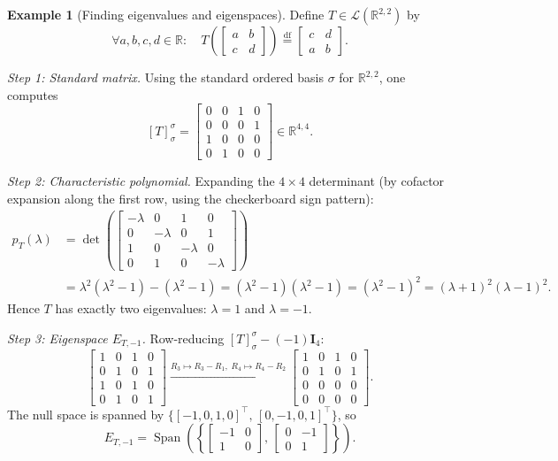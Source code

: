 \documentclass[11pt, a4paper, notitlepage]{report}
\theoremstyle{definition}
\newtheorem{example}[theorem]{Example}
\theoremstyle{remark}
\begin{document}
\begin{example}[Finding eigenvalues and eigenspaces]\label{ex:eigenspace-computation}
Define $T \in \mathcal{L}(\mathbb{R}^{2,2})$ by
\[
  \forall a,b,c,d \in \mathbb{R} : \quad
  T\!\left(\begin{bmatrix}a&b\\c&d\end{bmatrix}\right)
  \stackrel{\mathrm{df}}{=}
  \begin{bmatrix}c&d\\a&b\end{bmatrix}.
\]

\emph{Step 1: Standard matrix.} Using the standard ordered basis $\sigma$ for
$\mathbb{R}^{2,2}$, one computes
\[
  [T]_\sigma^\sigma =
  \begin{bmatrix}0&0&1&0\\0&0&0&1\\1&0&0&0\\0&1&0&0\end{bmatrix} \in \mathbb{R}^{4,4}.
\]

\emph{Step 2: Characteristic polynomial.} Expanding the $4\times 4$ determinant (by cofactor
expansion along the first row, using the checkerboard sign pattern):
\begin{align*}
  p_T(\lambda) &= \det\!\left(
    \begin{bmatrix}-\lambda&0&1&0\\0&-\lambda&0&1\\1&0&-\lambda&0\\0&1&0&-\lambda\end{bmatrix}
  \right) \\
  &= \lambda^2(\lambda^2-1) - (\lambda^2-1)
  = (\lambda^2-1)(\lambda^2-1) = (\lambda^2-1)^2 = (\lambda+1)^2(\lambda-1)^2.
\end{align*}
Hence $T$ has exactly two eigenvalues: $\lambda = 1$ and $\lambda = -1$.

\emph{Step 3: Eigenspace $E_{T,-1}$.} Row-reducing $[T]_\sigma^\sigma - (-1)\mathbf{I}_4$:
\[
  \begin{bmatrix}1&0&1&0\\0&1&0&1\\1&0&1&0\\0&1&0&1\end{bmatrix}
  \xrightarrow{R_3 \mapsto R_3-R_1,\; R_4 \mapsto R_4-R_2}
  \begin{bmatrix}1&0&1&0\\0&1&0&1\\0&0&0&0\\0&0&0&0\end{bmatrix}.
\]
The null space is spanned by $\bigl\{[-1,0,1,0]^\top,\,[0,-1,0,1]^\top\bigr\}$, so
\[
  E_{T,-1} = \operatorname{Span}\!\left(\left\{\begin{bmatrix}-1&0\\1&0\end{bmatrix},\,
  \begin{bmatrix}0&-1\\0&1\end{bmatrix}\right\}\right).
\]


\end{example}
\end{document}
